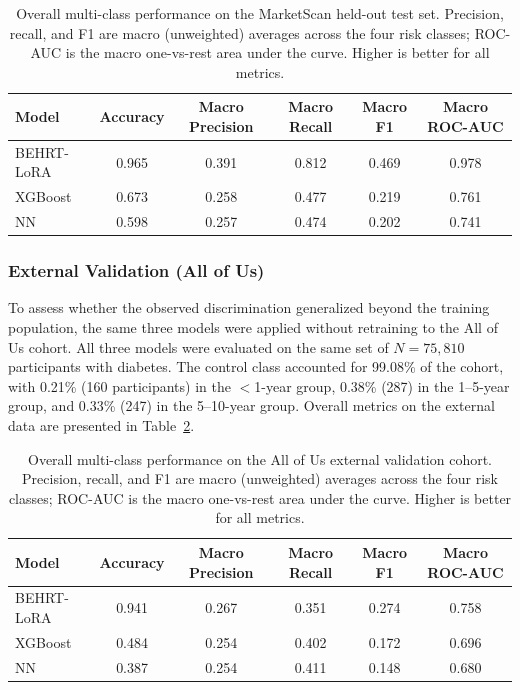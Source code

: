 \documentclass[12pt]{article}
\begin{document}
\begin{table}[H]
\centering
\caption{Overall multi-class performance on the MarketScan held-out test set. Precision, recall, and F1 are macro (unweighted) averages across the four risk classes; ROC-AUC is the macro one-vs-rest area under the curve. Higher is better for all metrics.}
\label{tab:overall_comparison}
\begin{tabular}{lccccc}
\toprule
Model & Accuracy & Macro Precision & Macro Recall & Macro F1 & Macro ROC-AUC \\
\midrule
BEHRT-LoRA & 0.965 & 0.391 & 0.812 & 0.469 & 0.978 \\
XGBoost    & 0.673 & 0.258 & 0.477 & 0.219 & 0.761 \\
NN         & 0.598 & 0.257 & 0.474 & 0.202 & 0.741 \\
\bottomrule
\end{tabular}
\end{table}


\subsubsection{External Validation (All of Us)}

To assess whether the observed discrimination generalized beyond the training population, the same three models were applied without retraining to the All of Us cohort. All three models were evaluated on the same set of $N = 75{,}810$ participants with diabetes.
The control class accounted for 99.08\% of the cohort, with 0.21\% (160 participants) in the $<$1-year group, 0.38\% (287) in the 1--5-year group, and 0.33\% (247) in the 5--10-year group.
Overall metrics on the external data are presented in Table~\ref{tab:aou_overall_comparison}.

\begin{table}[H]
\centering
\caption{Overall multi-class performance on the All of Us external validation cohort. Precision, recall, and F1 are macro (unweighted) averages across the four risk classes; ROC-AUC is the macro one-vs-rest area under the curve. Higher is better for all metrics.}
\label{tab:aou_overall_comparison}
\begin{tabular}{lccccc}
\toprule
Model & Accuracy & Macro Precision & Macro Recall & Macro F1 & Macro ROC-AUC \\
\midrule
BEHRT-LoRA & 0.941 & 0.267 & 0.351 & 0.274 & 0.758 \\
XGBoost    & 0.484 & 0.254 & 0.402 & 0.172 & 0.696 \\
NN         & 0.387 & 0.254 & 0.411 & 0.148 & 0.680 \\
\bottomrule
\end{tabular}
\end{table}
\end{document}
